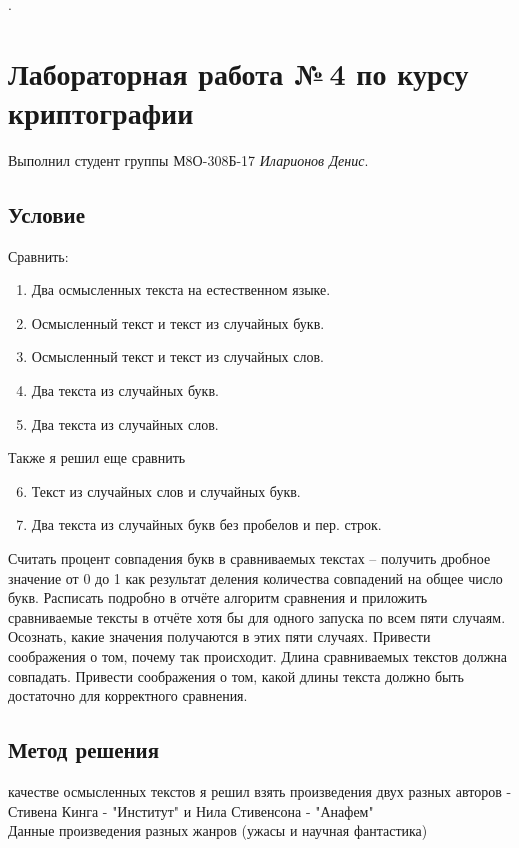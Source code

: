 \documentclass[12pt]{article}
\begin{document}
\lstset{extendedchars=\true}.
\newcommand*{\escape}[1]{\texttt{\textbackslash#1}}

\section*{Лабораторная работа №\,4 по курсу криптографии}

Выполнил студент группы М8О-308Б-17 \textit{Иларионов Денис}.

\subsection*{Условие}
Сравнить:
\begin{enumerate}
\item Два осмысленных текста на естественном языке.
\item Осмысленный текст и текст из случайных букв.
\item Осмысленный текст и текст из случайных слов.
\item Два текста из случайных букв.
\item Два текста из случайных слов.
\end{enumerate}
Также я решил еще сравнить
\begin{enumerate} 
\setcounter{enumi}{5}
\item Текст из случайных слов и случайных букв.
\item Два текста из случайных букв без пробелов и пер. строк.
\end{enumerate}

Считать процент совпадения букв в сравниваемых текстах – получить дробное значение от 0 до 1 как результат деления количества совпадений на общее число букв. Расписать подробно в отчёте алгоритм сравнения и приложить сравниваемые тексты в отчёте хотя бы для одного запуска по всем пяти случаям. Осознать, какие значения получаются в этих пяти случаях. Привести соображения о том, почему так происходит. Длина сравниваемых текстов должна совпадать. Привести соображения о том, какой длины текста должно быть достаточно для корректного сравнения.

\subsection*{Метод решения}
 качестве осмысленных текстов я решил взять произведения двух разных авторов - Стивена Кинга - "Институт" и Нила Стивенсона - "Анафем"\\
Данные произведения разных жанров (ужасы и научная фантастика)\\
\end{document}
